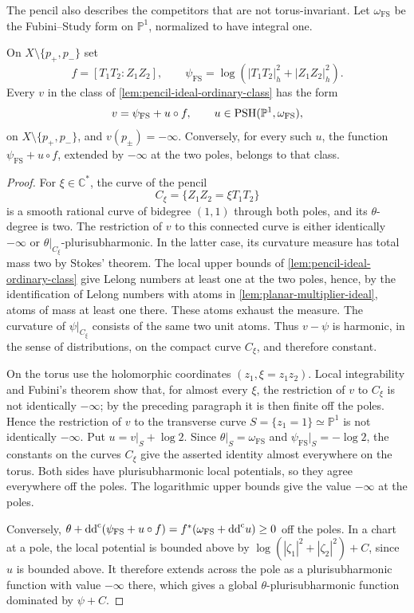 The pencil also describes the competitors that are not torus-invariant. Let $\omega_{\mathrm{FS}}$ be the Fubini--Study form on $\mathbb P^1$, normalized to have integral one.

\begin{lemma}\label{lem:pencil-full-competitors}
On $X\setminus\{p_+,p_-\}$ set
\[
 f=[T_1T_2:Z_1Z_2],\qquad
 \psi_{\mathrm{FS}}=\log(|T_1T_2|_h^2+|Z_1Z_2|_h^2).
\]
Every $v$ in the class of \cref{lem:pencil-ideal-ordinary-class} has the form
\[
 v=\psi_{\mathrm{FS}}+u\circ f,
 \qquad u\in\mathrm{PSH}(\mathbb P^1,\omega_{\mathrm{FS}}),
\]
on $X\setminus\{p_+,p_-\}$, and $v(p_\pm)=-\infty$. Conversely, for every such $u$, the function $\psi_{\mathrm{FS}}+u\circ f$, extended by $-\infty$ at the two poles, belongs to that class.
\end{lemma}
\begin{proof}
For $\xi\in\mathbb C^*$, the curve of the pencil
\[
 C_\xi=\{Z_1Z_2=\xi T_1T_2\}
\]
is a smooth rational curve of bidegree $(1,1)$ through both poles, and its $\theta$-degree is two. The restriction of $v$ to this connected curve is either identically $-\infty$ or $\theta|_{C_\xi}$-plurisubharmonic. In the latter case, its curvature measure has total mass two by Stokes' theorem. The local upper bounds of \cref{lem:pencil-ideal-ordinary-class} give Lelong numbers at least one at the two poles, hence, by the identification of Lelong numbers with atoms in \cref{lem:planar-multiplier-ideal}, atoms of mass at least one there. These atoms exhaust the measure. The curvature of $\psi|_{C_\xi}$ consists of the same two unit atoms. Thus $v-\psi$ is harmonic, in the sense of distributions, on the compact curve $C_\xi$, and therefore constant.

On the torus use the holomorphic coordinates $(z_1,\xi=z_1z_2)$. Local integrability and Fubini's theorem show that, for almost every $\xi$, the restriction of $v$ to $C_\xi$ is not identically $-\infty$; by the preceding paragraph it is then finite off the poles. Hence the restriction of $v$ to the transverse curve $S=\{z_1=1\}\simeq\mathbb P^1$ is not identically $-\infty$. Put $u=v|_S+\log2$. Since $\theta|_S=\omega_{\mathrm{FS}}$ and $\psi_{\mathrm{FS}}|_S=-\log2$, the constants on the curves $C_\xi$ give the asserted identity almost everywhere on the torus. Both sides have plurisubharmonic local potentials, so they agree everywhere off the poles. The logarithmic upper bounds give the value $-\infty$ at the poles.

Conversely, $\theta+\mathrm{dd}^{\mathrm{c}}(\psi_{\mathrm{FS}}+u\circ f)=f^*(\omega_{\mathrm{FS}}+\mathrm{dd}^{\mathrm{c}} u)\geq0$ off the poles. In a chart at a pole, the local potential is bounded above by $\log(|\zeta_1|^2+|\zeta_2|^2)+C$, since $u$ is bounded above. It therefore extends across the pole as a plurisubharmonic function with value $-\infty$ there, which gives a global $\theta$-plurisubharmonic function dominated by $\psi+C$.
\end{proof}


